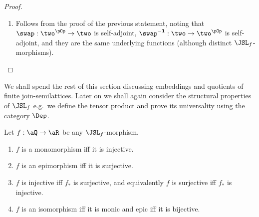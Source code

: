 \documentclass{article}
\begin{document}
\begin{proof}
\begin{enumerate}
\item
Follows from the proof of the previous statement, noting that $\swap : \two^{\pOp} \to \two$ is self-adjoint, $\swap^{\bf-1} : \two \to \two^{\pOp}$ is self-adjoint, and they are the same underlying functions (although distinct $\JSL_f$-morphisms).


\end{enumerate}

\end{proof}

We shall spend the rest of this section discussing embeddings and quotients of finite join-semilattices. Later on we shall again consider the structural properties of $\JSL_f$ e.g.\ we define the tensor product and prove its universality using the category $\Dep$.


\begin{lemma}
\label{lem:jsl_mono_epi_iso}
Let $f : \aQ \to \aR$ be any $\JSL_f$-morphism.
\begin{enumerate}
\item
$f$ is a monomorphism iff it is injective.
\item
$f$ is an epimorphism iff it is surjective.
\item
$f$ is injective iff $f_*$ is surjective, and equivalently $f$ is surjective iff $f_*$ is injective.
\item
$f$ is an isomorphism iff it is monic and epic iff it is bijective.
\end{enumerate}
\end{lemma}
\end{document}
